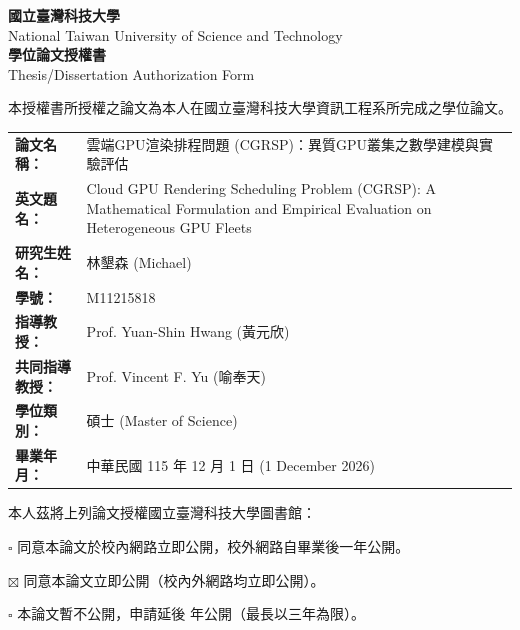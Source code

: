 \newpage
\thispagestyle{empty}

\begin{center}
{\Large \textbf{國立臺灣科技大學}}\\[0.3em]
{\large National Taiwan University of Science and Technology}\\[0.5em]
{\large \textbf{學位論文授權書}}\\[0.2em]
{\large Thesis/Dissertation Authorization Form}\\[1.5cm]
\end{center}

\noindent 本授權書所授權之論文為本人在國立臺灣科技大學資訊工程系所完成之學位論文。

\vspace{0.5cm}

\begin{tabular}{l>{\RaggedRight}p{9cm}}
\textbf{論文名稱：} & 雲端GPU渲染排程問題 (CGRSP)：異質GPU叢集之數學建模與實驗評估 \\[0.4em]
\textbf{英文題名：} & Cloud GPU Rendering Scheduling Problem (CGRSP): A Mathematical Formulation and Empirical Evaluation on Heterogeneous GPU Fleets \\[0.4em]
\textbf{研究生姓名：} & 林墾森 (Michael) \\[0.4em]
\textbf{學號：} & M11215818 \\[0.4em]
\textbf{指導教授：} & Prof. Yuan-Shin Hwang (黃元欣) \\[0.4em]
\textbf{共同指導教授：} & Prof. Vincent F. Yu (喻奉天) \\[0.4em]
\textbf{學位類別：} & 碩士 (Master of Science) \\[0.4em]
\textbf{畢業年月：} & 中華民國 115 年 12 月 1 日 (1 December 2026) \\
\end{tabular}

\vspace{1cm}

\noindent 本人茲將上列論文授權國立臺灣科技大學圖書館：

\vspace{0.5cm}

\noindent $\square$\hspace{0.3cm} 同意本論文於校內網路立即公開，校外網路自畢業後一年公開。

\noindent $\boxtimes$\hspace{0.3cm} 同意本論文立即公開（校內外網路均立即公開）。

\noindent $\square$\hspace{0.3cm} 本論文暫不公開，申請延後 \underline{\hspace{1cm}} 年公開（最長以三年為限）。

